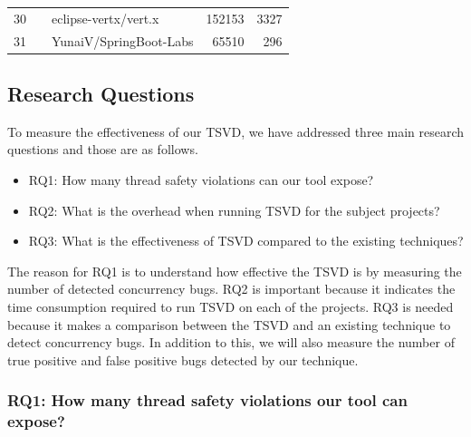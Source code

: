 \begin{table}
\begin{tabular}{|r|l|l|r|r|}
				30          &                              & eclipse-vertx/vert.x                                                                         & 152153                  & 3327                    \\ \cline{1-1} \cline{3-5} 
				31          &                              & YunaiV/SpringBoot-Labs                                                                       & 65510                   & 296                     \\ \hline
	\end{tabular}

\end{table}


\subsection{Research Questions}
To measure the effectiveness of our TSVD, we have addressed three main research questions and those are as follows.
\begin{itemize}
		        \item RQ1:  How many thread safety violations can our tool expose?
				        \item RQ2:  What is the overhead when running TSVD for the subject projects?
						        \item RQ3:  What is the effectiveness of TSVD compared to the existing techniques?
\end{itemize}
The reason for RQ1 is to understand how effective the TSVD is by measuring the
number of detected concurrency bugs.  RQ2 is important because it indicates the
time consumption required to run TSVD on each of the projects. RQ3 is needed
because it makes a comparison between the TSVD and an existing technique to
detect concurrency bugs.  In addition to this, we will also measure the number of true positive and false positive bugs detected by our technique.

\subsubsection{RQ1: How many thread safety violations our tool can expose?}
\label{sec:eval:rq1}

